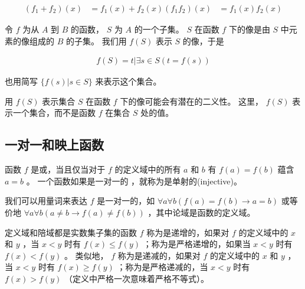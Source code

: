 {{\begin{defines}
            \begin{align*}
                (f_1 + f_2)(x) &= f_1(x) + f_2(x)
                (f_1f_2)(x) &= f_1(x)f_2(x)
            \end{align*}
        \end{defines}

        \begin{defines}
            令 $f$ 为从 $A$ 到 $B$ 的函数， $S$ 为 $A$ 的一个子集。
            $S$ 在函数 $f$ 下的像是由 $S$ 中元素的像组成的 $B$ 的子集。
            我们用 $f(S)$ 表示 $S$ 的像，于是

            \begin{align*}
                f(S) = {t | \exists s \in S (t = f(s))}
            \end{align*}

            也用简写 $\{f(s) | s \in S\}$ 来表示这个集合。
        \end{defines}

        \begin{defines}
            用 $f(S)$ 表示集合 $S$ 在函数 $f$ 下的像可能会有潜在的二义性。
            这里， $f(S)$ 表示一个集合，而不是函数 $f$ 在集合 $S$ 处的值。
        \end{defines}
    }

    \subsection{一对一和映上函数}
    {
        \begin{defines}
            函数 $f$ 是或，当且仅当对于 $f$ 的定义域中的所有 $a$ 和 $b$ 有 $f(a) = f(b)$ 蕴含 $a = b$ 。
            一个函数如果是一对一的 ，就称为是单射的(injective)。
        \end{defines}

        \begin{defines}
            我们可以用量词来表达 $f$ 是一对一的，如 $\forall a \forall b (f(a) = f(b) \rightarrow a = b)$ 或等价地 $\forall a \forall b (a \neq b \rightarrow f(a) \neq f(b))$ ，其中论域是函数的定义域。
        \end{defines}

        \begin{defines}
            定义域和陪域都是实数集子集的函数 $f$ 称为是递增的，如果对 $f$ 的定义域中的 $x$ 和 $y$ ，当 $x < y$ 时有 $f(x) \leq f(y)$ ；称为是严格递增的，如果当 $x < y$ 时有 $f(x) < f(y)$ 。
            类似地， $f$ 称为是递减的，如果对 $f$ 的定义域中的 $x$ 和 $y$ ，当 $x < y$ 时有 $f(x) \geq f(y)$ ；称为是严格递减的，当 $x < y$ 时有 $f(x) > f(y)$ （定义中严格一次意味着严格不等式）。
        \end{defines}
    }
}
